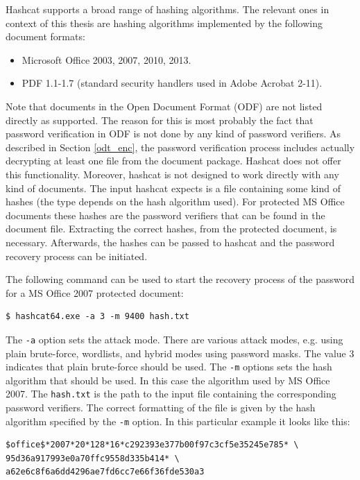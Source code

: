 \documentclass[11pt,oneside]{fithesis2}
\begin{document}
Hashcat supports a broad range of hashing algorithms. The relevant ones in context of this thesis are hashing algorithms implemented by the following document formats: 

\begin{itemize}
\setlength\itemsep{0.1em}
	\item{Microsoft Office 2003, 2007, 2010, 2013.}
	\item{PDF 1.1-1.7 (standard security handlers used in Adobe Acrobat 2-11).}	
\end{itemize}

Note that documents  in the Open Document Format (ODF) are not listed directly as supported. The reason for this is most probably the fact that password verification in ODF is not done by any kind of password verifiers. As described in Section \ref{odt_enc}, the password verification process includes actually decrypting at least one file from the document package. Hashcat does not offer this functionality. Moreover, hashcat is not designed to work directly with any kind of documents. The input hashcat expects is a file containing some kind of hashes (the type depends on the hash algorithm used). For protected MS Office documents these hashes are the password verifiers that can be found in the document file. Extracting the correct hashes, from the protected document, is necessary. Afterwards, the hashes can be passed to hashcat and the password recovery process can be initiated. 

The following command can be used to start the recovery process of the password for a MS Office 2007 protected document:

\begin{lstlisting}
$ hashcat64.exe -a 3 -m 9400 hash.txt
\end{lstlisting}

The \texttt{-a} option sets the attack mode. There are various attack modes, e.g. using plain brute-force, wordlists, and hybrid modes using password masks. The value 3 indicates that plain brute-force should be used. The \texttt{-m} options sets the hash algorithm that should be used. In this case the algorithm used by MS Office 2007. The \texttt{hash.txt} is the path to the input file containing the corresponding password verifiers. The correct formatting of the file is given by the hash algorithm specified by the \texttt{-m} option. In this particular example it looks like this:

\begin{lstlisting}
$office$*2007*20*128*16*c292393e377b00f97c3cf5e35245e785* \
95d36a917993e0a70ffc9558d335b414* \
a62e6c8f6a6dd4296ae7fd6cc7e66f36fde530a3
\end{lstlisting}
\end{document}
